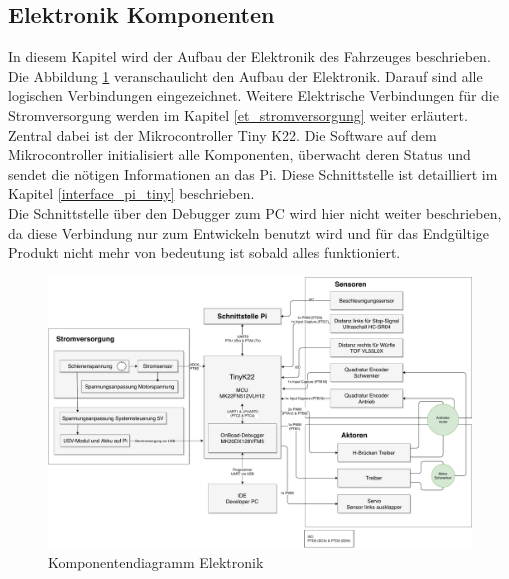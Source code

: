 \documentclass[../../main.tex]{subfiles}
\begin{document}
    \subsection{Elektronik Komponenten}
    In diesem Kapitel wird der Aufbau der Elektronik des Fahrzeuges beschrieben. \\
    Die Abbildung \ref{fig:et_komponenten} veranschaulicht den Aufbau der Elektronik. Darauf sind alle logischen Verbindungen eingezeichnet. Weitere Elektrische Verbindungen für die Stromversorgung werden im Kapitel \ref{et_stromversorgung} weiter erläutert.\\
    Zentral dabei ist der Mikrocontroller Tiny K22. Die Software auf dem Mikrocontroller initialisiert alle Komponenten, überwacht deren Status und sendet die nötigen Informationen an  das Pi. Diese Schnittstelle ist detailliert im Kapitel \ref{interface_pi_tiny} beschrieben.\\
    Die Schnittstelle über den Debugger zum PC wird hier nicht weiter beschrieben, da diese Verbindung nur zum Entwickeln benutzt wird und für das Endgültige Produkt nicht mehr von bedeutung ist sobald alles funktioniert.

    \begin{figure}[H]
        \centering
        \includegraphics[width=1.0\textwidth]{../../drawings/KomponentenDiagramm/KomponentenDiagramm_ET.pdf}
        \caption {Komponentendiagramm Elektronik}
        \label{fig:et_komponenten}
    \end{figure}
\end{document}
